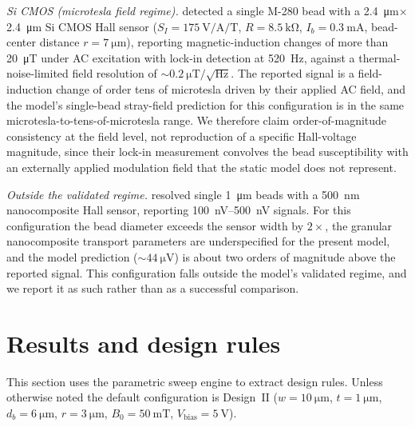 \documentclass[pdflatex,sn-basic]{sn-jnl}
\theoremstyle{thmstyleone}
\theoremstyle{thmstyletwo}
\theoremstyle{thmstylethree}
\begin{document}
\textit{Si CMOS (microtesla field regime).} \citet{besse2002} detected a single M-280 bead with a \SI{2.4}{\micro\meter}$\times$\SI{2.4}{\micro\meter} Si CMOS Hall sensor ($S_I = \SI{175}{\volt\per\ampere\per\tesla}$, $R = \SI{8.5}{\kilo\ohm}$, $I_b = \SI{0.3}{\milli\ampere}$, bead-center distance $r = \SI{7}{\micro\meter}$), reporting magnetic-induction changes of more than \SI{20}{\micro\tesla} under AC excitation with lock-in detection at \SI{520}{\hertz}, against a thermal-noise-limited field resolution of ${\sim}\SI{0.2}{\micro\tesla}/\sqrt{\si{\hertz}}$. The reported signal is a field-induction change of order tens of microtesla driven by their applied AC field, and the model's single-bead stray-field prediction for this configuration is in the same microtesla-to-tens-of-microtesla range. We therefore claim order-of-magnitude consistency at the field level, not reproduction of a specific Hall-voltage magnitude, since their lock-in measurement convolves the bead susceptibility with an externally applied modulation field that the static model does not represent.

\textit{Outside the validated regime.} \citet{gabureac2013} resolved single \SI{1}{\micro\meter} beads with a \SI{500}{\nano\meter} nanocomposite Hall sensor, reporting \SIrange{100}{500}{\nano\volt} signals. For this configuration the bead diameter exceeds the sensor width by $2\times$, the granular nanocomposite transport parameters are underspecified for the present model, and the model prediction (${\sim}\SI{44}{\micro\volt}$) is about two orders of magnitude above the reported signal. This configuration falls outside the model's validated regime, and we report it as such rather than as a successful comparison.

\section{Results and design rules}\label{sec:results}

This section uses the parametric sweep engine to extract design rules. Unless otherwise noted the default configuration is Design~II ($w = \SI{10}{\micro\meter}$, $t = \SI{1}{\micro\meter}$, $d_b = \SI{6}{\micro\meter}$, $r = \SI{3}{\micro\meter}$, $B_0 = \SI{50}{\milli\tesla}$, $V_{\text{bias}} = \SI{5}{\volt}$).

\end{document}
